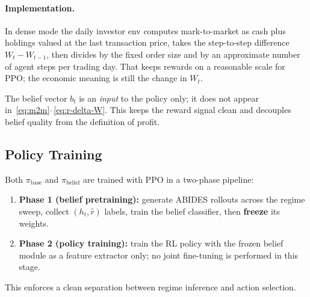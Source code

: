 \documentclass[11pt]{article}
\begin{document}

\paragraph{Implementation.}
In dense mode the daily investor env computes mark-to-market as cash plus holdings valued at the last
transaction price, takes the step-to-step difference $W_t - W_{t-1}$, then divides by the fixed order size and
by an approximate number of agent steps per trading day. That keeps rewards on a reasonable scale for PPO; the
economic meaning is still the change in $W_t$.

The belief vector $b_t$ is an \emph{input} to the policy only; it does not appear in~\eqref{eq:m2m}--\eqref{eq:r-delta-W}.
This keeps the reward signal clean and decouples belief quality from the definition of profit.

\subsection{Policy Training}

Both $\pi_{\text{base}}$ and $\pi_{\text{belief}}$ are trained with PPO in a two-phase pipeline:
\begin{enumerate}[leftmargin=1.4em]
  \item \textbf{Phase 1 (belief pretraining):} generate ABIDES rollouts across the regime sweep,
  collect $(h_t,\hat{r})$ labels, train the belief classifier, then \textbf{freeze} its weights.
  \item \textbf{Phase 2 (policy training):} train the RL policy with the frozen belief module as a
  feature extractor only; no joint fine-tuning is performed in this stage.
\end{enumerate}
This enforces a clean separation between regime inference and action selection.
\end{document}
